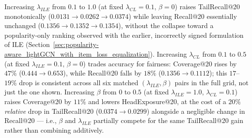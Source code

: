 Increasing $\lambda_{ILE}$ from $0.1$ to $1.0$ (at fixed $\lambda_{CL}=0.1$, $\beta=0$) raises
TailRecall@20 monotonically ($0.0131 \to 0.0262 \to 0.0374$) while leaving Recall@20
essentially unchanged ($0.1356 \to 0.1352 \to 0.1354$), without the collapse toward a
popularity-only ranking observed with the earlier, incorrectly signed formulation of ILE
(Section~\ref{sec:popularity-aware_lightGCN_with_item_loss_equalization}). Increasing
$\lambda_{CL}$ from $0.1$ to $0.5$ (at fixed $\lambda_{ILE}=0.1$, $\beta=0$) trades accuracy
for fairness: Coverage@20 rises by $47\%$ ($0.444\to0.653$), while Recall@20 falls by $18\%$
($0.1356\to0.1112$); this $17$--$19\%$ drop is consistent across all six matched
$(\lambda_{ILE},\beta)$ pairs in the full grid, not just the one shown. Increasing $\beta$
from $0$ to $0.5$ (at fixed $\lambda_{ILE}=1.0$, $\lambda_{CL}=0.1$) raises Coverage@20 by
$11\%$ and lowers HeadExposure@20, at the cost of a $20\%$ \emph{relative} drop in
TailRecall@20 ($0.0374\to0.0299$) alongside a negligible change in Recall@20 --- i.e.,
$\beta$ and $\lambda_{ILE}$ partially compete for the same TailRecall@20 gain rather than
combining additively.

\begin{table}[t]
\centering
\footnotesize
\caption{Isolated effect of each hyperparameter: single-seed grid search at $K=2$, changing
exactly one factor at a time from the base row. Supplementary evidence for hyperparameter
selection, not a substitute for the 3-seed results of Tables~\ref{tab:results-accuracy}--\ref{tab:results-bias}.}
\label{tab:results-sweep-isolated}
\end{table}

